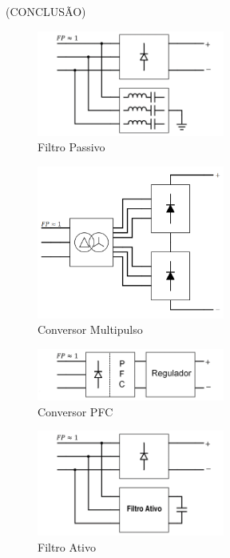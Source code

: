(CONCLUSÃO)

\begin{figure}[!htbp]
	\centering
	\includegraphics[width=0.55\textwidth]{Cap2/Figuras/sch_filtro_passivo.png}
	\caption{Filtro Passivo}
	\label{fig:sch_filtro_passivo}
\end{figure}

\begin{figure}[!htbp]
	\centering
	\includegraphics[width=0.55\textwidth]{Cap2/Figuras/sch_multipulso.png}
	\caption{Conversor Multipulso}
	\label{fig:sch_multipulso}
\end{figure}

\begin{figure}[!htbp]
	\centering
	\includegraphics[width=0.55\textwidth]{Cap2/Figuras/sch_PFC.png}
	\caption{Conversor PFC}
	\label{fig:sch_PFC}
\end{figure}

\begin{figure}[!htbp]
	\centering
	\includegraphics[width=0.55\textwidth]{Cap2/Figuras/sch_filtro_ativo.png}
	\caption{Filtro Ativo}
	\label{fig:sch_filtro_ativo}
\end{figure}
